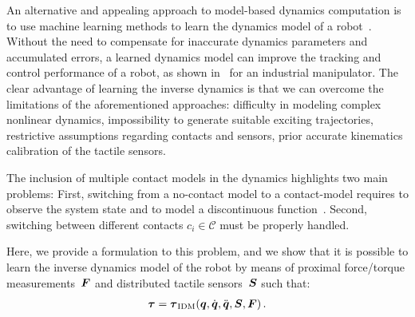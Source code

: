         An alternative and appealing approach to model-based dynamics computation is to use machine learning methods to learn the dynamics model of a robot~\cite{Nguyen-Tuong2008,Vijayakumar2000,Deisenroth2012}. 
        Without the need to compensate for inaccurate dynamics parameters and accumulated errors, a learned dynamics model can improve the tracking and control performance of a robot, as shown in~\cite{Nguyen-Tuong2011} for an industrial manipulator.
        The clear advantage of learning the inverse dynamics is that we can overcome the limitations of the aforementioned approaches: difficulty in modeling complex nonlinear dynamics, impossibility to generate suitable exciting trajectories, restrictive assumptions regarding contacts and sensors, prior accurate kinematics calibration of the tactile sensors.

        The inclusion of multiple contact models in the dynamics highlights two main problems:
        First, switching from a no-contact model to a contact-model requires to observe the system state and to model a discontinuous function~\cite{Toussaint2005}. 
        Second, switching between different contacts $c_i \in\mathcal{C}$ must be properly handled. %

        Here, we provide a formulation to this problem, and we show that it is possible to learn the inverse dynamics model of the robot by means of proximal force/torque measurements~$\boldsymbol{F}$ and distributed tactile sensors~$\mathcal{\boldsymbol{S}}$ such that:
        \begin{align}
        	\boldsymbol{\tau} = \boldsymbol{\tau}_\text{IDM}(\boldsymbol q,\dot{\boldsymbol q},\ddot{\boldsymbol q},\mathcal{\boldsymbol{S}},\boldsymbol{F}) \,.
            \label{eq:torques}
        \end{align}

